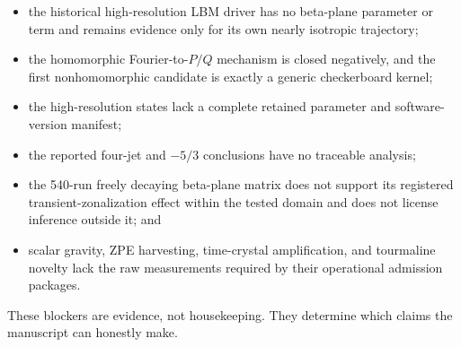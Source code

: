 \begin{itemize}
  \item the historical high-resolution LBM driver has no beta-plane parameter
    or term and remains evidence only for its own nearly isotropic trajectory;
  \item the homomorphic Fourier-to-$P/Q$ mechanism is closed negatively, and
    the first nonhomomorphic candidate is exactly a generic checkerboard kernel;
  \item the high-resolution states lack a complete retained parameter and
    software-version manifest;
  \item the reported four-jet and $-5/3$ conclusions have no traceable analysis;
  \item the 540-run freely decaying beta-plane matrix does not support its
    registered transient-zonalization effect within the tested domain and does
    not license inference outside it; and
  \item scalar gravity, ZPE harvesting, time-crystal amplification, and
    tourmaline novelty lack the raw measurements required by their operational
    admission packages.
\end{itemize}

These blockers are evidence, not housekeeping. They determine which claims the
manuscript can honestly make.
